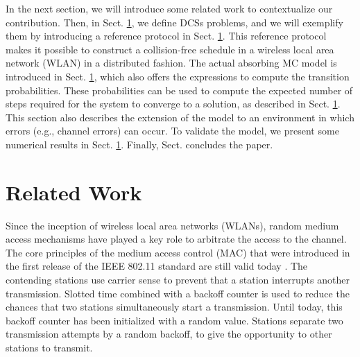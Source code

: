 \documentclass[journal]{IEEEtran}
\begin{document}
In the next section, we will introduce some related work to contextualize our contribution.
Then, in Sect. \ref{}, we define DCSs problems, and we will exemplify them by introducing a reference protocol in Sect. \ref{}.
This reference protocol makes it possible to construct a collision-free schedule in a wireless local area network (WLAN) in a distributed fashion.
The actual absorbing MC model is introduced in Sect. \ref{}, which also offers the expressions to compute the transition probabilities.
These probabilities can be used to compute the expected number of steps required for the system to converge to a solution, as described in Sect. \ref{}. 
This section also describes the extension of the model to an environment in which errors (e.g., channel errors) can occur.
To validate the model, we present some numerical results in Sect. \ref{}.
Finally, Sect.{} concludes the paper.
%

\section{Related Work}
Since the inception of wireless local area networks (WLANs), random medium access mechanisms have played a key role to arbitrate the access to the channel.
The core principles of the medium access control (MAC) that were introduced in the first release of the IEEE 802.11 standard are still valid today \cite{IEEE80211-IEEESTD2007}.
The contending stations use carrier sense to prevent that a station interrupts another transmission.
Slotted time combined with a backoff counter is used to reduce the chances that two stations simultaneously start a transmission.
Until today, this backoff counter has been initialized with a random value.
Stations separate two transmission attempts by a random backoff, to give the opportunity to other stations to transmit.
\end{document}
